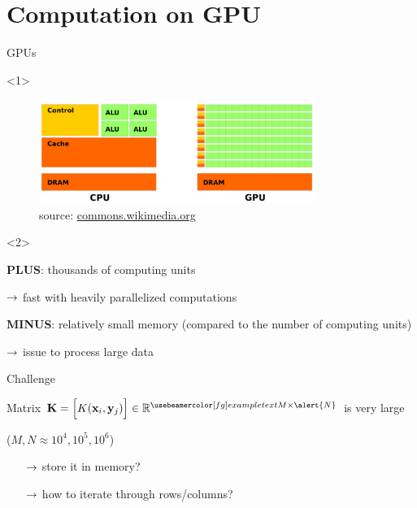 \documentclass[12pt,aspectratio=1610]{beamer}
\begin{document}
\section{Computation on GPU}


\begin{frame}{GPUs}

\begin{onlyenv}<1>
\begin{figure}
\centering
\includegraphics[width=0.8\textwidth]{images/cpu_gpu}
\caption{source: \url{commons.wikimedia.org}}
\end{figure}
\end{onlyenv}

\begin{onlyenv}<2>

\textbf{PLUS}: thousands of computing units

$\rightarrow$ fast with heavily parallelized computations\bigskip\bigskip

\textbf{MINUS}: relatively small memory {\small (compared to the number of computing units)}

$\rightarrow$ issue to process large data\bigskip

\end{onlyenv}




\end{frame}


\begin{frame}{Challenge}

\begin{center}
Matrix $\mb K = \Big[K(\mb x_i, \mb y_j)\Big] \in \RR^{\myexample{M}\times\alert{N}}$ is very large\medskip

($M, N \approx 10^4, 10^5, 10^6$)
\end{center}

\begin{itemize}
\setitsep{2em}
\item[$\rightarrow$] store it in memory? 
\item[$\rightarrow$] how to iterate through rows/columns?
\end{itemize}

\end{frame}
\end{document}
